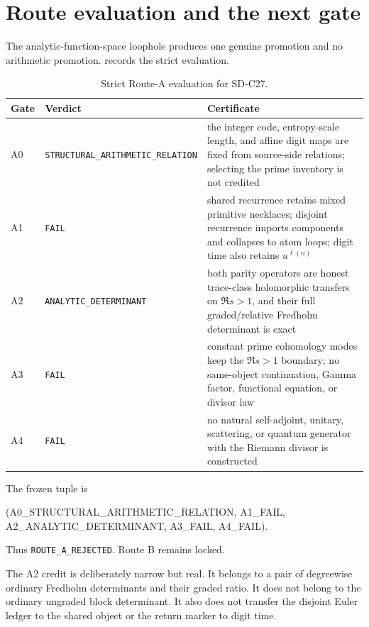 \section{Route evaluation and the next gate}
\label{sec:route}

The analytic-function-space loophole produces one genuine promotion and no
arithmetic promotion.   records the strict evaluation.

\begin{table}[H]
\centering
\caption{Strict Route-A evaluation for SD-C27.}
\label{tab:route}
\small
\begin{tabularx}{\textwidth}{L{1.0cm}L{4.2cm}Y}
\toprule
Gate & Verdict & Certificate \\
\midrule
A0 & \texttt{STRUCTURAL\_}\newline\texttt{ARITHMETIC\_RELATION}
& the integer code, entropy-scale length, and affine digit maps are fixed
from source-side relations; selecting the prime inventory is not credited \\
A1 & \texttt{FAIL}
& shared recurrence retains mixed primitive necklaces; disjoint recurrence
imports components and collapses to atom loops; digit time also retains
\(u^{\ell(n)}\) \\
A2 & \texttt{ANALYTIC\_DETERMINANT}
& both parity operators are honest trace-class holomorphic transfers on
\(\Re s>1\), and their full graded/relative Fredholm determinant is exact \\
A3 & \texttt{FAIL}
& constant prime cohomology modes keep the \(\Re s>1\) boundary; no
same-object continuation, Gamma factor, functional equation, or divisor law \\
A4 & \texttt{FAIL}
& no natural self-adjoint, unitary, scattering, or quantum generator with
the Riemann divisor is constructed \\
\bottomrule
\end{tabularx}
\end{table}

The frozen tuple is
\begin{center}
\small\ttfamily
(A0\_STRUCTURAL\_ARITHMETIC\_RELATION,\allowbreak
 A1\_FAIL,\allowbreak
 A2\_ANALYTIC\_DETERMINANT,\allowbreak
 A3\_FAIL,\allowbreak
 A4\_FAIL).
\end{center}
Thus \texttt{ROUTE\_A\_REJECTED}.  Route B remains locked.

The A2 credit is deliberately narrow but real.  It belongs to a pair of
degreewise ordinary Fredholm determinants and their graded ratio.  It does
not belong to the ordinary ungraded block determinant.  It also does not
transfer the disjoint Euler ledger to the shared object or the return marker
to digit time.

